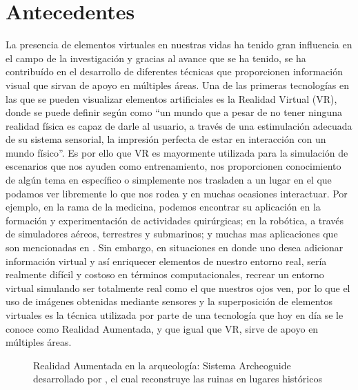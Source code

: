 \documentclass[a4paper,openright,12pt]{report}
\begin{document}
\section{Antecedentes}
La presencia de elementos virtuales en nuestras vidas ha tenido gran influencia en el campo de la investigación y gracias al avance que se ha tenido, se ha contribuído en el desarrollo de diferentes técnicas que proporcionen información visual que sirvan de apoyo en múltiples áreas. Una de las primeras tecnologías en las que se pueden visualizar elementos artificiales es la Realidad Virtual (VR), donde se puede definir según \cite{coiffet1995} como ``un mundo que a pesar de no tener ninguna realidad física es capaz de darle al usuario, a través de una estimulación adecuada de su sistema sensorial, la impresión perfecta de estar en interacción con un mundo físico''. Es por ello que VR es mayormente utilizada para la simulación de escenarios que nos ayuden como entrenamiento, nos proporcionen conocimiento de algún tema en específico o simplemente nos trasladen a un lugar en el que podamos ver libremente lo que nos rodea y en muchas ocasiones interactuar. Por ejemplo, en la rama de la medicina, podemos encontrar su aplicación en la formación y experimentación de actividades quirúrgicas; en la robótica, a través de simuladores aéreos, terrestres y submarinos; y muchas mas aplicaciones que son mencionadas en \cite{levis1997}. Sin embargo, en situaciones en donde uno desea adicionar información virtual y así enriquecer elementos de nuestro entorno real, sería realmente difícil y costoso en términos computacionales, recrear un entorno virtual simulando ser totalmente real como el que nuestros ojos ven, por lo que el uso de imágenes obtenidas mediante sensores y la superposición de elementos virtuales es la técnica utilizada por parte de una tecnología que hoy en día se le conoce como Realidad Aumentada, y que igual que VR, sirve de apoyo en múltiples áreas.
\begin{figure}[th]
	\centering
	\caption[Realidad Aumentada en la arqueología]{Realidad Aumentada en la arqueología: Sistema Archeoguide desarrollado por \cite{vlahakis2002}, el cual reconstruye las ruinas en lugares históricos} \label{fig:arqueologia}
\end{figure}
\end{document}
